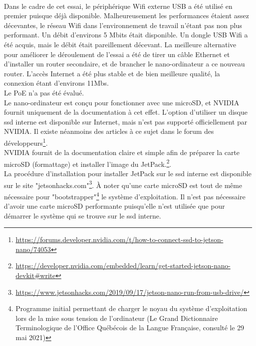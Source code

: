 \vspace{\baselineskip}
\\
\noindent Dans le cadre de cet essai, le périphérique Wifi externe USB a été utilisé en premier puisque déjà disponible. Malheureusement les performances étaient assez décevantes, le réseau Wifi dans l'environnement de travail n'étant pas non plus performant. Un débit d'environs 5 Mbits était disponible. Un dongle USB Wifi a été acquis, mais le débit était pareillement décevant. La meilleure alternative pour améliorer le déroulement de l'essai a été de tirer un câble Ethernet et d'installer un router secondaire, et de brancher le nano-ordinateur a ce nouveau router. L'accès Internet a été plus stable et de bien meilleure qualité, la connexion étant d'environs 11Mbs. 
\vspace{\baselineskip}
\\
\noindent Le PoE n'a pas été évalué. 
\vspace{\baselineskip}
\\
Le nano-ordinateur est conçu pour fonctionner avec une microSD, et NVIDIA fournit uniquement de la documentation à cet effet. L'option d'utiliser un disque \acrshort{ssd} interne est disponible sur Internet, mais n'est pas supporté officiellement par NVIDIA. Il existe néanmoins des articles à ce sujet dans le forum des développeurs\footnote{\url{https://forums.developer.nvidia.com/t/how-to-connect-ssd-to-jetson-nano/74053}}. 
\vspace{\baselineskip}
\\
\noindent NVIDIA fournit de la documentation claire et simple afin de préparer la carte microSD (formattage) et installer l'image du JetPack.\footnote{\url{https://developer.nvidia.com/embedded/learn/get-started-jetson-nano-devkit#write}}.
\vspace{\baselineskip}
\\
\noindent La procédure d'installation pour installer JetPack sur le \acrshort{ssd} interne est disponible sur le site "jetsonhacks.com"\footnote{\url{https://www.jetsonhacks.com/2019/09/17/jetson-nano-run-from-usb-drive/}}. À noter qu'une carte microSD est tout de même nécessaire pour "bootstrapper"\footnote{Programme initial permettant de charger le noyau du système d'exploitation lors de la mise sous tension de l'ordinateur (Le Grand Dictionnaire Terminologique de l'Office Québécois de la Langue Française, consulté le 29 mai 2021)} le système d'exploitation. Il n'est pas nécessaire d'avoir une carte microSD performante puisqu'elle n'est utilisée que pour démarrer le système qui se trouve sur le \acrshort{ssd} interne. 

